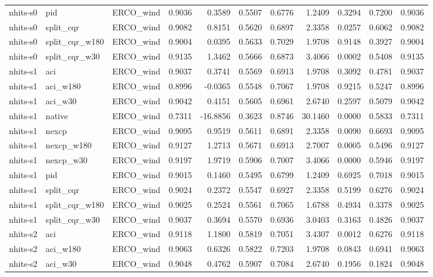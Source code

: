 \begin{tabular}{lllrrrrrrrr}
nhits-s0 & pid & ERCO_wind & 0.9036 & 0.3589 & 0.5507 & 0.6776 & 1.2409 & 0.3294 & 0.7200 & 0.9036 \\
nhits-s0 & split_cqr & ERCO_wind & 0.9082 & 0.8151 & 0.5620 & 0.6897 & 2.3358 & 0.0257 & 0.6062 & 0.9082 \\
nhits-s0 & split_cqr_w180 & ERCO_wind & 0.9004 & 0.0395 & 0.5633 & 0.7029 & 1.9708 & 0.9148 & 0.3927 & 0.9004 \\
nhits-s0 & split_cqr_w30 & ERCO_wind & 0.9135 & 1.3462 & 0.5666 & 0.6873 & 3.4066 & 0.0002 & 0.5408 & 0.9135 \\
nhits-s1 & aci & ERCO_wind & 0.9037 & 0.3741 & 0.5569 & 0.6913 & 1.9708 & 0.3092 & 0.4781 & 0.9037 \\
nhits-s1 & aci_w180 & ERCO_wind & 0.8996 & -0.0365 & 0.5548 & 0.7067 & 1.9708 & 0.9215 & 0.5247 & 0.8996 \\
nhits-s1 & aci_w30 & ERCO_wind & 0.9042 & 0.4151 & 0.5605 & 0.6961 & 2.6740 & 0.2597 & 0.5079 & 0.9042 \\
nhits-s1 & native & ERCO_wind & 0.7311 & -16.8856 & 0.3623 & 0.8746 & 30.1460 & 0.0000 & 0.5833 & 0.7311 \\
nhits-s1 & nexcp & ERCO_wind & 0.9095 & 0.9519 & 0.5611 & 0.6891 & 2.3358 & 0.0090 & 0.6693 & 0.9095 \\
nhits-s1 & nexcp_w180 & ERCO_wind & 0.9127 & 1.2713 & 0.5671 & 0.6913 & 2.7007 & 0.0005 & 0.5496 & 0.9127 \\
nhits-s1 & nexcp_w30 & ERCO_wind & 0.9197 & 1.9719 & 0.5906 & 0.7007 & 3.4066 & 0.0000 & 0.5946 & 0.9197 \\
nhits-s1 & pid & ERCO_wind & 0.9015 & 0.1460 & 0.5495 & 0.6799 & 1.2409 & 0.6925 & 0.7018 & 0.9015 \\
nhits-s1 & split_cqr & ERCO_wind & 0.9024 & 0.2372 & 0.5547 & 0.6927 & 2.3358 & 0.5199 & 0.6276 & 0.9024 \\
nhits-s1 & split_cqr_w180 & ERCO_wind & 0.9025 & 0.2524 & 0.5561 & 0.7065 & 1.6788 & 0.4934 & 0.3378 & 0.9025 \\
nhits-s1 & split_cqr_w30 & ERCO_wind & 0.9037 & 0.3694 & 0.5570 & 0.6936 & 3.0403 & 0.3163 & 0.4826 & 0.9037 \\
nhits-s2 & aci & ERCO_wind & 0.9118 & 1.1800 & 0.5819 & 0.7051 & 3.4307 & 0.0012 & 0.6276 & 0.9118 \\
nhits-s2 & aci_w180 & ERCO_wind & 0.9063 & 0.6326 & 0.5822 & 0.7203 & 1.9708 & 0.0843 & 0.6941 & 0.9063 \\
nhits-s2 & aci_w30 & ERCO_wind & 0.9048 & 0.4762 & 0.5907 & 0.7084 & 2.6740 & 0.1956 & 0.1824 & 0.9048 \\

\end{tabular}
